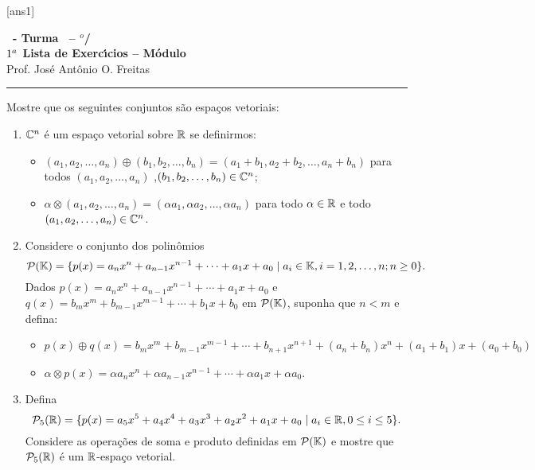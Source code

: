 \documentclass[12pt]{exam}
\begin{document}
  [ans1]
  \begin{center}
    {\Large\bf \disciplina\ - Turma \turma\ -- \semestre$^{o}$/\ano} \\ \vspace{9pt} {\large\bf
        $1^a$ Lista de Exerc{\'\i}cios -- Módulo \numeromodulo}\\ \vspace{9pt} Prof. Jos{\'e} Ant{\^o}nio O. Freitas
  \end{center}
  \hrule


\begin{exercicio}
  Mostre que os seguintes conjuntos s\~ao espa\c{c}os vetoriais:
  \begin{enumerate}[label={\alph*})]
    \item $\mathbb{C}^n$ \'e um espa\c{c}o vetorial sobre $\mathbb{R}$ se definirmos:
    \begin{itemize}
      \item $(a_1, a_2, \dots, a_n) \oplus (b_1, b_2, \dots,b_n) = (a_1 + b_1, a_2 + b_2,\dots, a_n + b_n)$ para todos $(a_1, a_2, \dots,a_n)$ ,$(b_1, b_2, \dots,b_n) \in \mathbb{C}^n$;
      \item $\alpha \otimes (a_1, a_2, \dots,a_n) = (\alpha a_1, \alpha a_2, \dots, \alpha a_n)$ para todo $\alpha \in \mathbb{R}$ e todo $(a_1, a_2, \dots, a_n) \in \mathbb{C}^n$.
    \end{itemize}
    \item Considere o conjunto dos polin\^omios
    \[
      \mathcal{P}(\mathbb{K}) = \{ p(x) = a_nx^n + a_{n - 1}x^{n - 1} + \cdots + a_1x + a_0 \mid a_i \in \mathbb{K}, i = 1, 2, \dots, n; n \ge 0 \}.
    \]
    Dados $p(x) = a_nx^n + a_{n - 1}x^{n - 1} + \cdots + a_1x + a_0$ e $q(x) = b_mx^m + b_{m - 1}x^{m - 1} + \cdots + b_1x + b_0$ em $\mathcal{P}(\mathbb{K})$, suponha que $n < m$ e defina:
    \begin{itemize}
      \item $p(x) \oplus q(x) = b_mx^m + b_{m - 1}x^{m - 1} + \cdots + b_{n + 1}x^{n + 1} + (a_n + b_n)x^n + (a_1 + b_1)x + (a_0 + b_0)$
      \item $\alpha\otimes p(x) = \alpha a_nx^n + \alpha a_{n - 1}x^{n - 1} + \cdots + \alpha a_1x + \alpha a_0$.
    \end{itemize}

    \item Defina
    \[
      \mathcal{P}_5(\mathbb{R}) = \{ p(x) = a_5x^5 + a_4x^4 + a_3x^3 + a_2x^2 + a_1x + a_0 \mid a_i \in \mathbb{R}, 0 \le i \le 5 \}.
    \]
    Considere as opera\c{c}\~oes de soma e produto definidas em $\mathcal{P}(\mathbb{K})$ e mostre que $\mathcal{P}_5(\mathbb{R})$ \'e um $\mathbb{R}$-espa\c{c}o vetorial.


\end{enumerate}
\end{exercicio}
\end{document}
